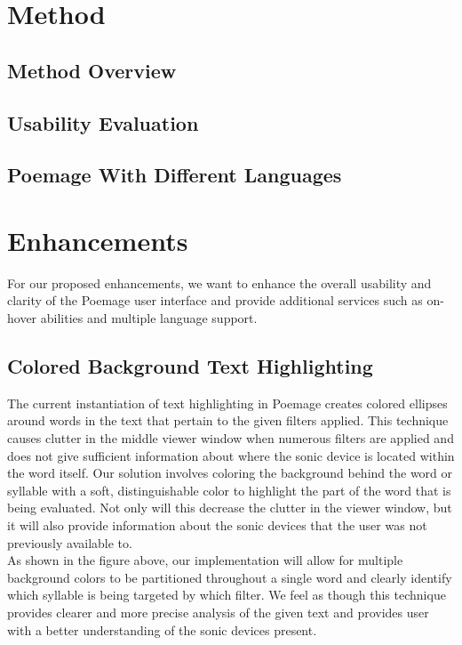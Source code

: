 \documentclass[journal]{vgtc}                %
\begin{document}
\section{Method} \label{method}
\subsection{Method Overview}

\subsection{Usability Evaluation}

\subsection{Poemage With Different Languages}

\section{Enhancements} \label{enhancements}
For our proposed enhancements, we want to enhance the overall usability and clarity of the Poemage user interface and provide additional services such as on-hover abilities and multiple language support.

\subsection{Colored Background Text Highlighting}
The current instantiation of text highlighting in Poemage creates colored ellipses around words in the text that pertain to the given filters applied. This technique causes clutter in the middle viewer window when numerous filters are applied and does not give sufficient information about where the sonic device is located within the word itself. Our solution involves coloring the background behind the word or syllable with a soft, distinguishable color to highlight the part of the word that is being evaluated. Not only will this decrease the clutter in the viewer window, but it will also provide information about the sonic devices that the user was not previously available to.\\ 
\indent As shown in the figure above, our implementation will allow for multiple background colors to be partitioned throughout a single word and clearly identify which syllable is being targeted by which filter. We feel as though this technique provides clearer and more precise analysis of the given text and provides user with a better understanding of the sonic devices present.
\end{document}
